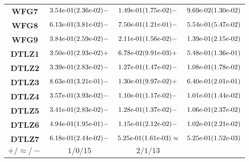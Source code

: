 \documentclass{article}
\begin{document}
\begin{table}[!htp]
\begin{tiny}
\begin{tabular}{c|ccc}
\textbf{WFG7} & ${3.54e\makebox[0.1cm]{-}01(2.36e\makebox[0.1cm]{-}02)-} $ & $ \cellcolor{gray25} {1.49e\makebox[0.1cm]{-}01(1.75e\makebox[0.1cm]{-}02)-} $ & $ \cellcolor{gray95} 9.69e\makebox[0.1cm]{-}02(1.30e\makebox[0.1cm]{-}02)$ \\
\textbf{WFG8} & $\cellcolor{gray25} {6.13e\makebox[0.1cm]{-}01(3.81e\makebox[0.1cm]{-}02)-} $ & $ {7.50e\makebox[0.1cm]{-}01(1.21e\makebox[0.1cm]{-}01)-} $ & $ \cellcolor{gray95} 5.54e\makebox[0.1cm]{-}01(5.47e\makebox[0.1cm]{-}02)$ \\
\textbf{WFG9} & ${3.84e\makebox[0.1cm]{-}01(2.59e\makebox[0.1cm]{-}02)-} $ & $ \cellcolor{gray25} {2.11e\makebox[0.1cm]{-}01(1.56e\makebox[0.1cm]{-}02)-} $ & $ \cellcolor{gray95} 1.39e\makebox[0.1cm]{-}01(2.15e\makebox[0.1cm]{-}02)$ \\
\textbf{DTLZ1} & $\cellcolor{gray25} {3.50e\makebox[0.1cm]{-}01(2.93e\makebox[0.1cm]{-}02)+} $ & $ \cellcolor{gray95} {6.78e\makebox[0.1cm]{-}02(9.91e\makebox[0.1cm]{-}03)+} $ & $ 5.48e\makebox[0.1cm]{-}01(1.36e\makebox[0.1cm]{-}01)$ \\
\textbf{DTLZ2} & ${3.39e\makebox[0.1cm]{-}01(2.83e\makebox[0.1cm]{-}02)-} $ & $ \cellcolor{gray25} {1.27e\makebox[0.1cm]{-}01(1.47e\makebox[0.1cm]{-}02)-} $ & $ \cellcolor{gray95} 1.08e\makebox[0.1cm]{-}01(1.78e\makebox[0.1cm]{-}02)$ \\
\textbf{DTLZ3} & ${8.63e\makebox[0.1cm]{-}01(3.21e\makebox[0.1cm]{-}01)-} $ & $ \cellcolor{gray95} {1.30e\makebox[0.1cm]{-}01(9.97e\makebox[0.1cm]{-}02)+} $ & $ \cellcolor{gray25} 6.40e\makebox[0.1cm]{-}01(2.01e\makebox[0.1cm]{-}01)$ \\
\textbf{DTLZ4} & ${3.57e\makebox[0.1cm]{-}01(3.93e\makebox[0.1cm]{-}02)-} $ & $ \cellcolor{gray25} {1.10e\makebox[0.1cm]{-}01(1.17e\makebox[0.1cm]{-}02)-} $ & $ \cellcolor{gray95} 1.01e\makebox[0.1cm]{-}01(1.44e\makebox[0.1cm]{-}02)$ \\
\textbf{DTLZ5} & ${3.41e\makebox[0.1cm]{-}01(2.83e\makebox[0.1cm]{-}02)-} $ & $ \cellcolor{gray25} {1.28e\makebox[0.1cm]{-}01(1.37e\makebox[0.1cm]{-}02)-} $ & $ \cellcolor{gray95} 1.06e\makebox[0.1cm]{-}01(2.37e\makebox[0.1cm]{-}02)$ \\
\textbf{DTLZ6} & ${4.94e\makebox[0.1cm]{-}01(1.95e\makebox[0.1cm]{-}01)-} $ & $ \cellcolor{gray25} {1.15e\makebox[0.1cm]{-}01(2.12e\makebox[0.1cm]{-}02)-} $ & $ \cellcolor{gray95} 1.02e\makebox[0.1cm]{-}01(2.21e\makebox[0.1cm]{-}02)$ \\
\textbf{DTLZ7} & ${6.18e\makebox[0.1cm]{-}01(2.44e\makebox[0.1cm]{-}02)-} $ & $ \cellcolor{gray25} {5.25e\makebox[0.1cm]{-}01(1.61e\makebox[0.1cm]{-}03)\approx} $ & $ \cellcolor{gray95} 5.25e\makebox[0.1cm]{-}01(1.52e\makebox[0.1cm]{-}03)$ \\
  \hline
\textbf{$+/\approx/-$} & $1/0/15 $ & $ 2/1/13$ \\
  \end{tabular}
  \end{tiny}
\end{table}
\end{document}
